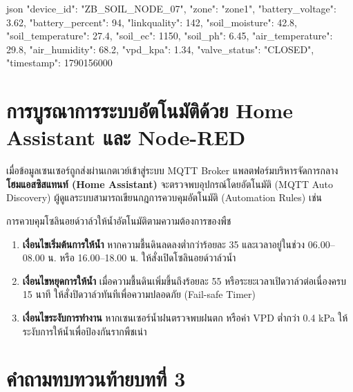 \begin{codebox}{json}
{
  "device_id": "ZB_SOIL_NODE_07",
  "zone": "zone1",
  "battery_voltage": 3.62,
  "battery_percent": 94,
  "linkquality": 142,
  "soil_moisture": 42.8,
  "soil_temperature": 27.4,
  "soil_ec": 1150,
  "soil_ph": 6.45,
  "air_temperature": 29.8,
  "air_humidity": 68.2,
  "vpd_kpa": 1.34,
  "valve_status": "CLOSED",
  "timestamp": 1790156000
}
\end{codebox}

\section{การบูรณาการระบบอัตโนมัติด้วย Home Assistant และ Node-RED}

เมื่อข้อมูลเซนเซอร์ถูกส่งผ่านเกตเวย์เข้าสู่ระบบ MQTT Broker แพลตฟอร์มบริหารจัดการกลาง \textbf{โฮมแอสซิสแทนท์ (Home Assistant)} จะตรวจพบอุปกรณ์โดยอัตโนมัติ (MQTT Auto Discovery) ผู้ดูแลระบบสามารถเขียนกฎการควบคุมอัตโนมัติ (Automation Rules) เช่น

\begin{agribox}
การควบคุมโซลินอยด์วาล์วให้น้ำอัตโนมัติตามความต้องการของพืช
\begin{enumerate}
    \item \textbf{เงื่อนไขเริ่มต้นการให้น้ำ} หากความชื้นดินลดลงต่ำกว่าร้อยละ 35 และเวลาอยู่ในช่วง 06.00--08.00 น. หรือ 16.00--18.00 น. ให้สั่งเปิดโซลินอยด์วาล์วน้ำ
    \item \textbf{เงื่อนไขหยุดการให้น้ำ} เมื่อความชื้นดินเพิ่มขึ้นถึงร้อยละ 55 หรือระยะเวลาเปิดวาล์วต่อเนื่องครบ 15 นาที ให้สั่งปิดวาล์วทันทีเพื่อความปลอดภัย (Fail-safe Timer)
    \item \textbf{เงื่อนไขระงับการทำงาน} หากเซนเซอร์น้ำฝนตรวจพบฝนตก หรือค่า VPD ต่ำกว่า 0.4 kPa ให้ระงับการให้น้ำเพื่อป้องกันรากพืชเน่า
\end{enumerate}
\end{agribox}

\clearpage

\section*{คำถามทบทวนท้ายบทที่ 3}

